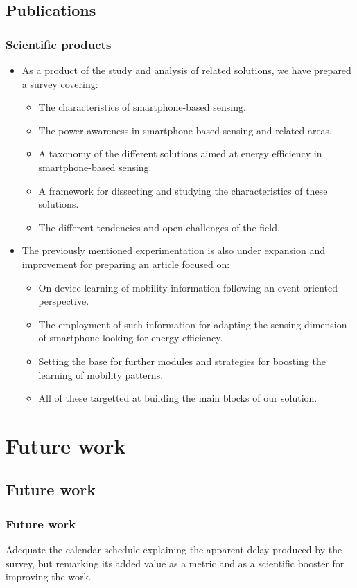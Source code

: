 \documentclass[compress,9pt,xcolor={dvipsnames,table}]{beamer}
\begin{document}
\subsection{Publications}
\begin{frame}[t]\frametitle{Scientific products}
\begin{itemize}
  \item As a product of the study and analysis of related solutions, we have prepared a survey covering:
  \begin{itemize}
    \item The characteristics of smartphone-based sensing.
    \item The power-awareness in smartphone-based sensing and related areas.
    \item A taxonomy of the different solutions aimed at energy efficiency in smartphone-based sensing.
    \item A framework for dissecting and studying the characteristics of these solutions.
    \item The different tendencies and open challenges of the field.
  \end{itemize}
  \item The previously mentioned experimentation is also under expansion and improvement for preparing an article focused on:
  \begin{itemize}
    \item On-device learning of mobility information following an event-oriented perspective.
    \item The employment of such information for adapting the sensing dimension of smartphone looking for energy efficiency.
    \item Setting the base for further modules and strategies for boosting the learning of mobility patterns.
    \item All of these targetted at building the main blocks of our solution.
  \end{itemize}
\end{itemize}
\end{frame}


\section{Future work}
\subsection{Future work}
\begin{frame}[t]\frametitle{Future work}
    
Adequate the calendar-schedule explaining the apparent delay produced by the survey, but remarking its added value as a metric and as a scientific booster for improving the work.
\end{frame}
\end{document}

